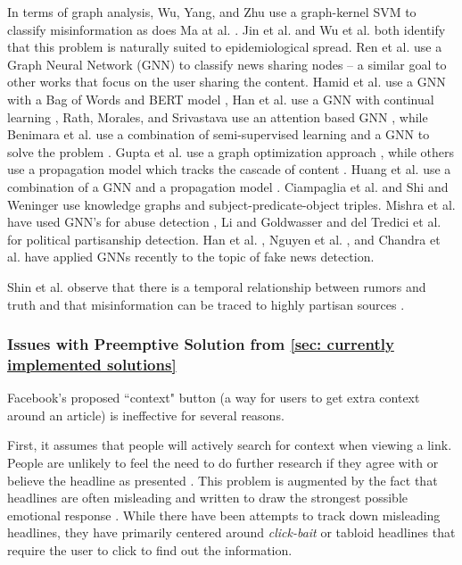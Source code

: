 \documentclass[preprint,review,12pt]{elsarticle}
\begin{document}
In terms of graph analysis, Wu, Yang, and Zhu \cite{wu2015false} use a graph-kernel SVM to classify misinformation as does Ma at al. \cite{ma2017detect}. Jin et al. \cite{jin2013epidemiological} and Wu et al. \cite{wu2016mining} both identify that this problem is naturally suited to epidemiological spread. Ren et al. use a Graph Neural Network (GNN) to classify news sharing nodes \cite{ren2020adversarial} -- a similar goal to other works that focus on the user sharing the content. Hamid et al. use a GNN with a Bag of Words and BERT model \cite{hamid2020fake}, Han et al. use a GNN with continual learning \cite{han2020graph}, Rath, Morales, and Srivastava use an attention based GNN \cite{rath2021scarlet}, while Benimara et al. use a combination of semi-supervised learning and a GNN to solve the problem \cite{benamira2019semi}. Gupta et al. use a graph optimization approach \cite{gupta2012evaluating}, while others use a propagation model which tracks the cascade of content \cite{jin2016news,jin2014news,zhou2018fake,kashima2003marginalized}. Huang et al. use a combination of a GNN and a propagation model \cite{huang2019deep}. Ciampaglia et al. \cite{ciampaglia2015computational} and Shi and Weninger \cite{shi2016discriminative} use knowledge graphs and subject-predicate-object triples. Mishra et al. have used GNN's for abuse detection \cite{mishra2019abusive}, Li and Goldwasser \cite{li2019encoding} and del Tredici et al. \cite{del2019you} for political partisanship detection. Han et al. \cite{han2020graph}, Nguyen et al. \cite{nguyen2020fang}, and Chandra et al. \cite{chandra2020graph} have applied GNNs recently to the topic of fake news detection. 

 Shin et al. observe that there is a temporal relationship between rumors and truth and that misinformation can be traced to highly partisan sources \cite{shin2018diffusion}.
 
 
 \subsubsection{Issues with Preemptive Solution from \ref{sec: currently implemented solutions}}
 Facebook's proposed ``context" button (a way for users to get extra context around an article) is ineffective for several reasons. 
 
 First, it assumes that people will actively search for context when viewing a link. People are unlikely to feel the need to do further research if they agree with or believe the headline as presented \cite{nyhan2010corrections}. This problem is augmented by the fact that headlines are often misleading and written to draw the strongest possible emotional response \cite{chesney2017incongruent,ecker2014effects,bell1984good,molek2013towards,kilgo2018new,vettehen2008explaining}.  While there have been attempts to track down misleading headlines, they have primarily centered around \textit{click-bait} or tabloid headlines \cite{chen2015misleading,chakraborty2016stop} that require the user to click to find out the information. 
 
\end{document}
